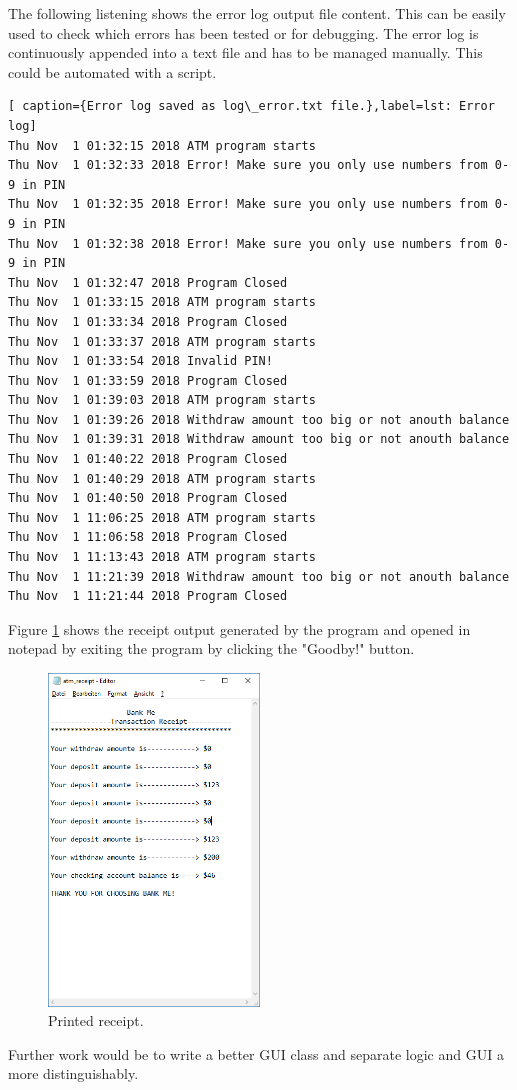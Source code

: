 The following listening shows the error log output file content. This can be easily used to check which errors has been tested or for debugging. The error log is continuously appended into a text file and has to be managed manually. This could be automated with a script. 
\begin{lstlisting}[ caption={Error log saved as log\_error.txt file.},label=lst: Error log]
Thu Nov  1 01:32:15 2018 ATM program starts 
Thu Nov  1 01:32:33 2018 Error! Make sure you only use numbers from 0-9 in PIN
Thu Nov  1 01:32:35 2018 Error! Make sure you only use numbers from 0-9 in PIN
Thu Nov  1 01:32:38 2018 Error! Make sure you only use numbers from 0-9 in PIN
Thu Nov  1 01:32:47 2018 Program Closed
Thu Nov  1 01:33:15 2018 ATM program starts 
Thu Nov  1 01:33:34 2018 Program Closed
Thu Nov  1 01:33:37 2018 ATM program starts 
Thu Nov  1 01:33:54 2018 Invalid PIN!
Thu Nov  1 01:33:59 2018 Program Closed
Thu Nov  1 01:39:03 2018 ATM program starts 
Thu Nov  1 01:39:26 2018 Withdraw amount too big or not anouth balance
Thu Nov  1 01:39:31 2018 Withdraw amount too big or not anouth balance
Thu Nov  1 01:40:22 2018 Program Closed
Thu Nov  1 01:40:29 2018 ATM program starts 
Thu Nov  1 01:40:50 2018 Program Closed
Thu Nov  1 11:06:25 2018 ATM program starts 
Thu Nov  1 11:06:58 2018 Program Closed
Thu Nov  1 11:13:43 2018 ATM program starts 
Thu Nov  1 11:21:39 2018 Withdraw amount too big or not anouth balance
Thu Nov  1 11:21:44 2018 Program Closed
\end{lstlisting}
\newpage
Figure \ref{fig: printed_receipt} shows the receipt output generated by the program and opened in notepad by exiting the program by clicking the "Goodby!" button.
\begin{figure}[H]
	\centering
	\includegraphics[width=0.5\textwidth]{01_images/printed_receipt.PNG}
	\caption{Printed receipt.}
	\label{fig: printed_receipt}
\end{figure}

Further work would be to write a better GUI class and separate logic and GUI a more distinguishably. 